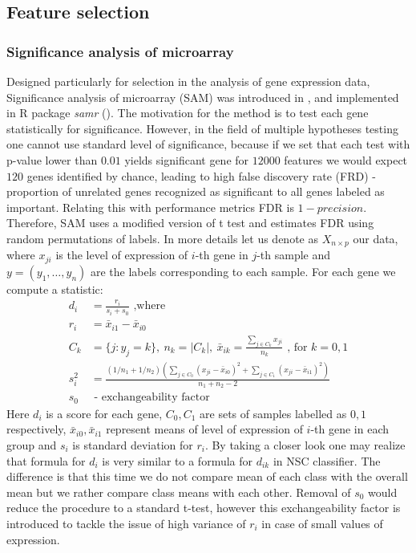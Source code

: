 \documentclass[shortabstract, english, mgr]{iithesis}
\begin{document}
\subsection{Feature selection} \label{section:feat-selection}

\subsubsection{Significance analysis of microarray}

Designed particularly for selection in the analysis of gene expression data, Significance analysis of microarray (SAM) was introduced in \cite{SAM}, \cite{SAM2} and implemented in R package \textit{samr} (\cite{samManual}). The motivation for the method is to test each gene statistically for significance. However, in the field of multiple hypotheses testing one cannot use standard level of significance, because if we set that each test with p-value lower than $0.01$ yields significant gene for $12000$ features we would expect $120$ genes identified by chance, leading to high false discovery rate (FRD) - proportion of unrelated genes recognized as significant to all genes labeled as important. Relating this with performance metrics FDR is $1 - precision$. Therefore, SAM uses a modified version of t test and estimates FDR using random permutations of labels. In more details let us denote as $X_{n\times p}$ our data, where $x_{ji}$ is the level of expression of $i$-th gene in $j$-th sample and $y = \left( y_1, \ldots, y_n\right)$ are the labels corresponding to each sample. For each gene we compute a statistic:
\begin{align*}
d_{i} &= \frac{r_i}{s_i+s_0} \text{ ,where}\\
r_i &= \bar{x}_{i1} - \bar{x}_{i0} \\
C_k &= \{ j: y_j = k\}, \ n_k = |C_k|, \ \bar{x}_{ik} = \frac{\sum_{j \in C_{k}} x_{j i}}{n_{k}} \text{ , for } k = 0,1 \\
s_i^2 &= \frac{\left(1 / n_{1}+1 / n_{2}\right)\left(\sum_{j \in C_{0}}\left(x_{ji}-\bar{x}_{i0}\right)^{2}+\sum_{j \in C_{1}}\left(x_{ji}-\bar{x}_{i1}\right)^{2}\right)}{n_{1}+n_{2}-2} \\
s_0& \text{ - exchangeability factor}
\end{align*}
Here $d_i$ is a score for each gene, $C_0, C_1$ are sets of samples labelled as $0,1$ respectively, $\bar{x}_{i0}, \bar{x}_{i1}$ represent means of level of expression of $i$-th gene in each group and $s_i$ is standard deviation for $r_i$. By taking a closer look one may realize that formula for $d_i$ is very similar to a formula for $d_{ik}$ in NSC classifier. The difference is that this time we do not compare mean of each class with the overall mean but we rather compare class means with each other. Removal of $s_0$ would reduce the procedure to a standard t-test, however this exchangeability factor is introduced to tackle the issue of high variance of $r_i$ in case of small values of expression.
\end{document}
